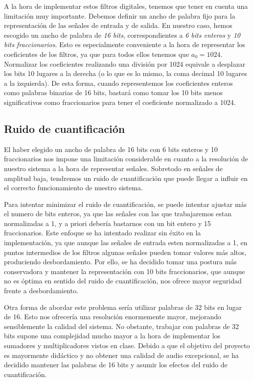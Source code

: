 \documentclass[a4paper,12pt]{article}
\begin{document}
A la hora de implementar estos filtros digitales, tenemos que tener en cuenta una limitación muy importante. Debemos definir un ancho de palabra fijo para la representación de las señales de entrada y de salida. En nuestro caso, hemos escogido un ancho de palabra de \emph{16 bits}, correspondientes a \emph{6 bits enteros} y \emph{10 bits fraccionarios}. Esto es especialmente conveniente a la hora de representar los coeficientes de los filtros, ya que para todos ellos tenemos que $a_0 = 1024$. Normalizar los coeficientes realizando una división por 1024 equivale a desplazar los bits 10 lugares a la derecha (o lo que es lo mismo, la coma decimal 10 lugares a la izquierda). De esta forma, cuando representemos los coeficientes enteros como palabras binarias de 16 bits, bastará como tomar los 10 bits menos significativos como fraccionarios para tener el coeficiente normalizado a 1024.

\subsection{Ruido de cuantificación}
El haber elegido un ancho de palabra de 16 bits con 6 bits enteros y 10 fraccionarios nos impone una limitación considerable en cuanto a la resolución de nuestro sistema a la hora de representar señales. Sobretodo en señales de amplitud baja, tendremos un ruido de cuantificación que puede llegar a influir en el correcto funcionamiento de nuestro sistema.

Para intentar minimizar el ruido de cuantificación, se puede intentar ajustar más el numero de bits enteros, ya que las señales con las que trabajaremos estan normalizadas a 1, y a priori debería bastarnos con un bit entero y 15 fraccionarios. Este enfoque se ha intentado realizar sin éxito en la implementación, ya que aunque las señales de entrada esten normalizadas a 1, en puntos intermedios de los filtros algunas señales pueden tomar valores más altos, produciendo desbordamiento. Por ello, se ha decidido tomar una postura más conservadora y mantener la representación con 10 bits fraccionarios, que aunque no es óptima en sentido del ruido de cuantificación, nos ofrece mayor seguridad frente a desbordamiento.

Otra forma de abordar este problema sería utilizar palabras de 32 bits en lugar de 16. Esto nos ofrecería una resolución enormemente mayor, mejorando sensiblemente la calidad del sistema. No obstante, trabajar con palabras de 32 bits supone una complejidad mucho mayor a la hora de implementar los sumadores y multiplicadores vistos en clase. Debido a que el objetivo del proyecto es mayormente didáctico y no obtener una calidad de audio excepcional, se ha decidido mantener las palabras de 16 bits y asumir los efectos del ruido de cuantificación.
\end{document}
